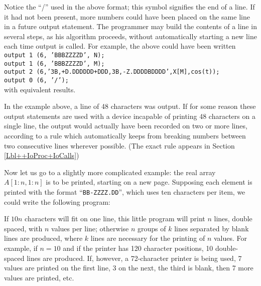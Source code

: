 \documentclass[a4paper,11pt]{article}
\begin{document}
Notice the ``/'' used in the above format; this symbol signifies the
end of a line.  If it had not been present, more numbers could have
been placed on the same line in a future output statement.  The
programmer may build the contents of a line in several steps, as his
algorithm proceeds, without automatically starting a new line each
time output is called.  For example, the above could have been
written\vspace{0.5em}\\
{\tt output 1 (6, 'BBBZZZZD', N);\\
output 1 (6, 'BBBZZZZD', M);\\
output 2 (6,'3B,+D.DDDDDD\ten{}+DDD,3B,-Z.DDDDBDDDD',X[M],cos(t));\\
output 0 (6, '/');}\vspace{0.5em}\\
with equivalent results.

In the example above, a line of 48 characters was output.  If for some
reason these output statements are used with a device incapable of
printing 48 characters on a single line, the output would actually
have been recorded on two or more lines, according to a rule which
automatically keeps from breaking numbers between two consecutive
lines wherever possible. (The exact rule appears in Section
\ref{Lbl++IoProc+IoCalls})

Now let us go to a slightly more complicated example: the real array
$A[1:n, 1:n]$ is to be printed, starting on a new page.  Supposing
each element is printed with the format ``{\tt BB-ZZZZ.DD}'', which
uses ten characters per item, we could write the following program:


If $10n$ characters will fit on one line, this little program will
print $n$ lines, double spaced, with $n$ values per line; otherwise
$n$ groups of $k$ lines separated by blank lines are produced, where
$k$ lines are necessary for the printing of $n$ values.  For example,
if $n = 10$ and if the printer has 120 character positions, 10
double-spaced lines are produced.  If, however, a 72-character printer
is being used, 7 values are printed on the first line, 3 on the next,
the third is blank, then 7 more values are printed, etc.
\end{document}
